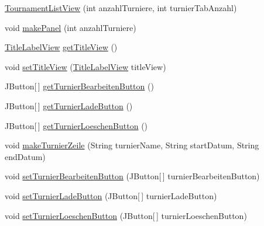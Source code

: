 \begin{DoxyCompactItemize}
\item 
\hyperlink{classde_1_1turnierverwaltung_1_1view_1_1_tournament_list_view_ad5c4dfc20e8178ded394b3560ae6a1a7}{Tournament\+List\+View} (int anzahl\+Turniere, int turnier\+Tab\+Anzahl)
\item 
void \hyperlink{classde_1_1turnierverwaltung_1_1view_1_1_tournament_list_view_abc32cc786359ef550fc495926524efc9}{make\+Panel} (int anzahl\+Turniere)
\item 
\hyperlink{classde_1_1turnierverwaltung_1_1view_1_1_title_label_view}{Title\+Label\+View} \hyperlink{classde_1_1turnierverwaltung_1_1view_1_1_tournament_list_view_a8827578c219940c82de0423b4661debd}{get\+Title\+View} ()
\item 
void \hyperlink{classde_1_1turnierverwaltung_1_1view_1_1_tournament_list_view_a659daa41c424f3fa0fed125bb965f4e9}{set\+Title\+View} (\hyperlink{classde_1_1turnierverwaltung_1_1view_1_1_title_label_view}{Title\+Label\+View} title\+View)
\item 
J\+Button\mbox{[}$\,$\mbox{]} \hyperlink{classde_1_1turnierverwaltung_1_1view_1_1_tournament_list_view_a57183f193fdca71b441e5a5e90b53061}{get\+Turnier\+Bearbeiten\+Button} ()
\item 
J\+Button\mbox{[}$\,$\mbox{]} \hyperlink{classde_1_1turnierverwaltung_1_1view_1_1_tournament_list_view_af5208d78e46792045c00d05203d518a6}{get\+Turnier\+Lade\+Button} ()
\item 
J\+Button\mbox{[}$\,$\mbox{]} \hyperlink{classde_1_1turnierverwaltung_1_1view_1_1_tournament_list_view_a636be5652ba20116ef92746cd0821726}{get\+Turnier\+Loeschen\+Button} ()
\item 
void \hyperlink{classde_1_1turnierverwaltung_1_1view_1_1_tournament_list_view_a267808ba5fcfc844bfa51c00e9baf8b9}{make\+Turnier\+Zeile} (String turnier\+Name, String start\+Datum, String end\+Datum)
\item 
void \hyperlink{classde_1_1turnierverwaltung_1_1view_1_1_tournament_list_view_aa4f390088ba4967f293bea9853e17031}{set\+Turnier\+Bearbeiten\+Button} (J\+Button\mbox{[}$\,$\mbox{]} turnier\+Bearbeiten\+Button)
\item 
void \hyperlink{classde_1_1turnierverwaltung_1_1view_1_1_tournament_list_view_aec69c5e0bf97df5851b8c4cb10bef6a2}{set\+Turnier\+Lade\+Button} (J\+Button\mbox{[}$\,$\mbox{]} turnier\+Lade\+Button)
\item 
void \hyperlink{classde_1_1turnierverwaltung_1_1view_1_1_tournament_list_view_aeb340cc63a84735901f56e870544d10d}{set\+Turnier\+Loeschen\+Button} (J\+Button\mbox{[}$\,$\mbox{]} turnier\+Loeschen\+Button)
\end{DoxyCompactItemize}


